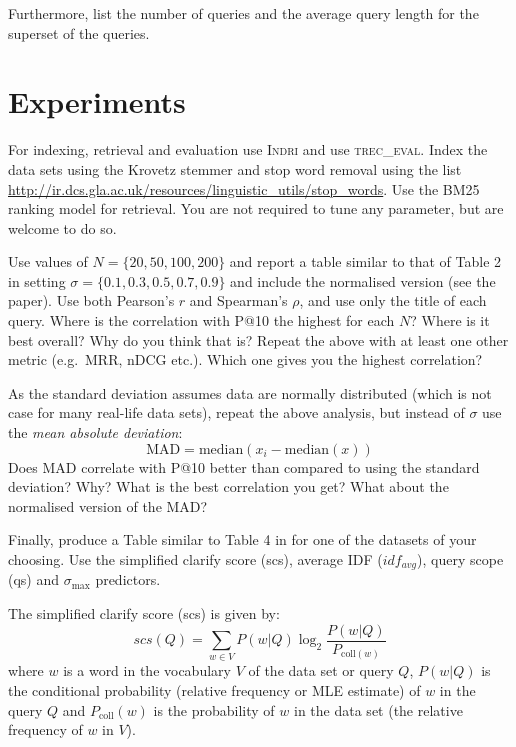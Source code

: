 \documentclass{sig-alternate}
\begin{document}
Furthermore, list the number of queries and the average query length for the superset of the queries.

\section{Experiments}
For indexing, retrieval and evaluation use \textsc{Indri} and use \textsc{trec\_eval}. Index the data sets using the Krovetz stemmer and stop word removal using the list \url{http://ir.dcs.gla.ac.uk/resources/linguistic_utils/stop_words}. Use the BM25 ranking model for retrieval. You are not required to tune any parameter, but are welcome to do so.

Use values of $N=\{20,50,100,200\}$ and report a table similar to that of Table 2 in \cite{cummins2011improved} setting $\sigma=\{0.1,0.3,0.5,0.7,0.9\}$ and include the normalised version (see the paper). Use both Pearson's $r$ and Spearman's $\rho$, and use only the title of each query. Where is the correlation with P@10 the highest for each $N$? Where is it best overall? Why do you think that is? Repeat the above with at least one other metric (e.g.\ MRR, nDCG etc.). Which one gives you the highest correlation?

As the standard deviation assumes data are normally distributed (which is not case for many real-life data sets), repeat the above analysis, but instead of $\sigma$ use the \emph{mean absolute deviation}:
\begin{equation}
\text{MAD} = \text{median}\left(x_i - \text{median}(x)\right)
\end{equation}
Does MAD correlate with P@10 better than compared to using the standard deviation? Why? What is the best correlation you get? What about the normalised version of the MAD?

Finally, produce a Table similar to Table 4 in \cite{cummins2011improved} for one of the datasets of your choosing. Use the simplified clarify score (scs), average IDF ($idf_{avg}$), query scope (qs) and $\sigma_{\max}$ predictors. 

The simplified clarify score \cite{he2004inferring} (scs) is given by:
\begin{equation}
scs(Q) = \displaystyle\sum_{w\in V}P(w\vert Q)\log_2\frac{P(w\vert Q)}{P_{\text{coll}(w)}}
\end{equation}
where $w$ is a word in the vocabulary $V$ of the data set or query $Q$, $P(w\vert Q)$ is the conditional probability (relative frequency or MLE estimate) of $w$ in the query $Q$ and $P_{\text{coll}}(w)$ is the probability of $w$ in the data set (the relative frequency of $w$ in $V$).
\end{document}
